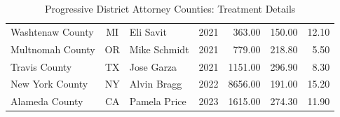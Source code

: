 \begin{table}[ht]
\begin{tabular}{lclcrrr}
  Washtenaw County & MI & Eli Savit & 2021 & 363.00 & 150.00 & 12.10 \\ 
  Multnomah County & OR & Mike Schmidt & 2021 & 779.00 & 218.80 & 5.50 \\ 
  Travis County & TX & Jose Garza & 2021 & 1151.00 & 296.90 & 8.30 \\ 
  New York County & NY & Alvin Bragg & 2022 & 8656.00 & 191.00 & 15.20 \\ 
  Alameda County & CA & Pamela Price & 2023 & 1615.00 & 274.30 & 11.90 \\ 
   \bottomrule
\end{tabular}
\caption{Progressive District Attorney Counties: Treatment Details} 
\label{tab:treatment}
\end{table}
